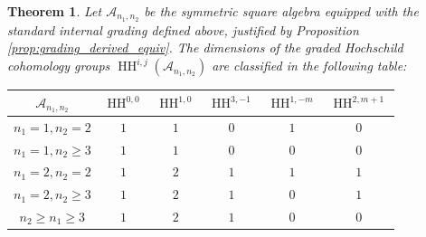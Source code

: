 \documentclass[a4paper, reqno, 11pt]{amsart}
\newtheorem{theorem}{Theorem}[section]
\theoremstyle{definition}
\begin{document}
\begin{theorem}\label{thm:graded_HH}
	Let $\mathcal{A}_{n_1,n_2}$ be the symmetric square algebra equipped with the standard internal grading defined above, justified by Proposition \ref{prop:grading_derived_equiv}. The dimensions of the graded Hochschild cohomology groups $\operatorname{HH}^{i,j}(\mathcal{A}_{n_1,n_2})$ are classified in the following table:
	\begin{center}
		\renewcommand{\arraystretch}{1.3}
		\begin{tabular}{c|ccccc}
			\hline
			$\mathcal{A}_{n_1,n_2}$& $\operatorname{HH}^{0,0}$ & $\operatorname{HH}^{1,0}$ & $\operatorname{HH}^{3,-1}$ & $\operatorname{HH}^{1,-m}$ & $\operatorname{HH}^{2,m+1}$ \\
			\hline
			$n_1=1, n_2=2$ & $1$ & $1$ & $0$ & $1$ & $0$  \\
			$n_1=1, n_2\ge 3$ & $1$ & $1$ & $0$ & $0$ & $0$ \\
			$n_1=2, n_2=2$ & $1$ & $2$ & $1$ & $1$ & $1$ \\
			$n_1=2, n_2\ge 3$ & $1$ & $2$ & $1$ & $0$ & $1$ \\
			$n_2\ge n_1 \ge 3$ & $1$ & $2$ & $1$ & $0$ & $0$ \\
			\hline
		\end{tabular}
	\end{center}
\end{theorem}
\end{document}
